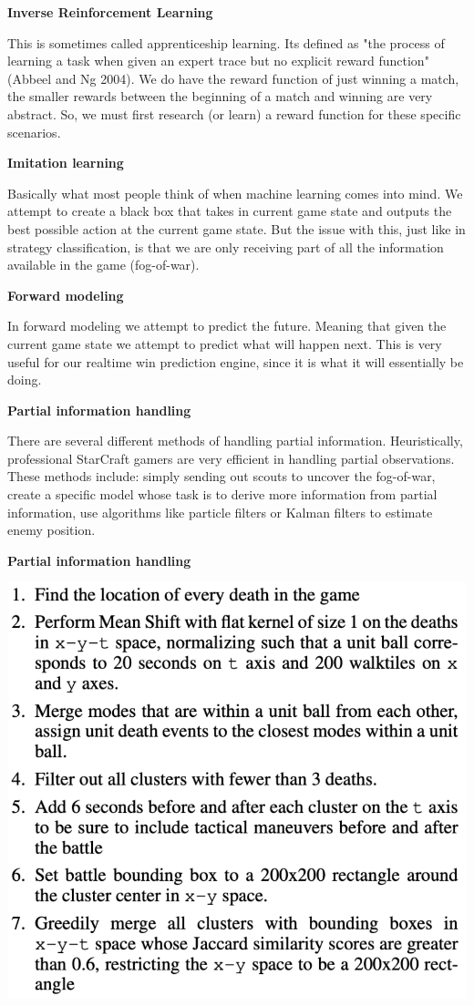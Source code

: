 \documentclass[a4paper,12pt]{report}
\newcommand{\msection}[1]{\noindent\textbf{#1}}
\begin{document}
\msection{Inverse Reinforcement Learning}

This is sometimes called apprenticeship learning. Its defined as "the process of learning a task when given an expert trace but no explicit reward function" (Abbeel and Ng 2004). We do have the reward function of just winning a match, the smaller rewards between the beginning of a match and winning are very abstract. So, we must first research (or learn) a reward function for these specific scenarios.

\msection{Imitation learning}

Basically what most people think of when machine learning comes into mind. We attempt to create a black box that takes in current game state and outputs the best possible action at the current game state. But the issue with this, just like in strategy classification, is that we are only receiving part of all the information available in the game (fog-of-war).

\msection{Forward modeling}

In forward modeling we attempt to predict the future. Meaning that given the current game state we attempt to predict what will happen next. This is very useful for our realtime win prediction engine, since it is what it will essentially be doing.

\msection{Partial information handling}

There are several different methods of handling partial information. Heuristically, professional StarCraft gamers are very efficient in handling partial observations. These methods include: simply sending out scouts to uncover the fog-of-war, create a specific model whose task is to derive more information from partial information, use algorithms like particle filters or Kalman filters to estimate enemy position.

\msection{Partial information handling}

\includegraphics[width=.6\linewidth]{media/battle.png}
\end{document}

